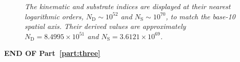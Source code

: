 \begin{figure}[H]
{    \newline
    \textit{The kinematic and substrate indices are displayed at their nearest logarithmic orders, $N_{\mathrm D}\sim10^{52}$ and $N_{\mathrm S}\sim10^{70}$, to match the base-10 spatial axis. Their derived values are approximately $N_{\mathrm D}=8.4995\times10^{51}$ and $N_{\mathrm S}=3.6121\times10^{69}$.}}
    \label{fig:unified_phase_map}
\end{figure}

\vspace{2cm}

\begin{center}
    \textbf{\Large END OF Part~\ref{part:three}}
\end{center}